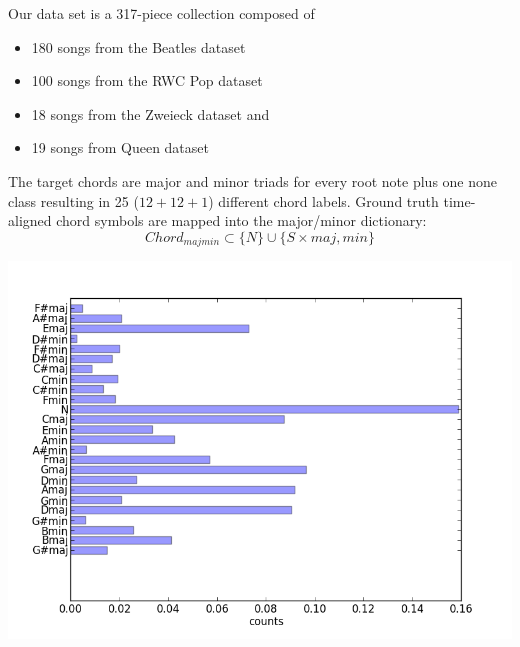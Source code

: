 \documentclass[landscape,archE1,fontscale=0.315]{baposter} %
\begin{document}
\begin{poster}
{%
%
Our data set is a 317-piece collection composed of 
\begin{itemize}
  \item 180 songs from the Beatles dataset
  \item 100 songs from the RWC Pop dataset
  \item 18 songs from the Zweieck dataset and
  \item 19 songs from Queen dataset
\end{itemize}
The target chords are major and minor triads for every root note plus one none class resulting in 25 ($12+12+1$) different chord labels. Ground truth time-aligned chord symbols are mapped into the major/minor dictionary:
\begin{equation}
Chord_{majmin} \subset \{N\} \cup \{S \times {maj,min}\}
\end{equation}
\begin{center}
\includegraphics[width=0.65\linewidth]{chordDistrib}
\end{center}

}




\end{poster}
\end{document}
